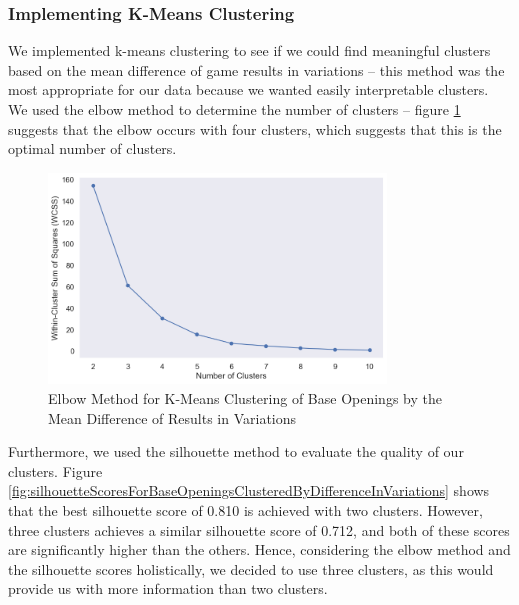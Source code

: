 \documentclass[a4paper, 11pt]{article}
\begin{document}
\subsubsection{Implementing K-Means Clustering}
We implemented k-means clustering to see if we could find meaningful clusters based on the mean difference of game results in variations -- this method was the most appropriate for our data because we wanted easily interpretable clusters. We used the elbow method to determine the number of clusters -- figure \ref{fig:elbowMethodForBaseOpeningsClusteredByDifferenceInVariations} suggests that the elbow occurs with four clusters, which suggests that this is the optimal number of clusters.

\begin{figure}[H]
    \centering
    \caption{Elbow Method for K-Means Clustering of Base Openings by the Mean Difference of Results in Variations}
    \label{fig:elbowMethodForBaseOpeningsClusteredByDifferenceInVariations}
    \includegraphics[width=0.8\textwidth]{Elbow Method for Clustering of Base Opening by Difference in Variations.png}
\end{figure}

Furthermore, we used the silhouette method to evaluate the quality of our clusters. Figure \ref{fig:silhouetteScoresForBaseOpeningsClusteredByDifferenceInVariations} shows that the best silhouette score of 0.810 is achieved with two clusters. However, three clusters achieves a similar silhouette score of 0.712, and both of these scores are significantly higher than the others. Hence, considering the elbow method and the silhouette scores holistically, we decided to use three clusters, as this would provide us with more information than two clusters.
\end{document}
